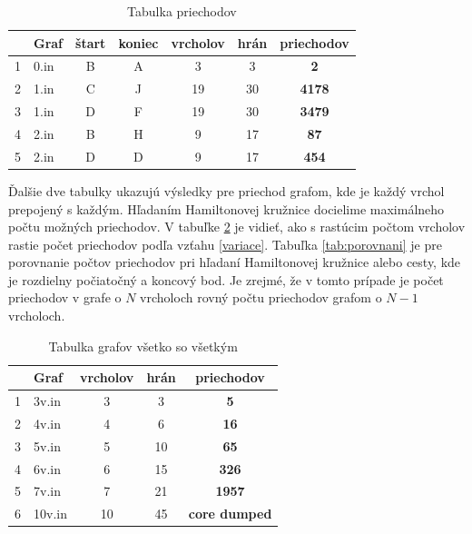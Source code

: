 \documentclass[a4paper,11pt, titlepage]{article}
\begin{document}
\begin{table}[h]
	\centering
	\begin{tabular}{|l|l|c|c|c|c|c|}
		\hline
		  & Graf & štart & koniec & vrcholov &  hrán & priechodov      \\ \hline
		1 & 0.in & B     & A     & 3             & 3          & \textbf{2}    \\ \hline
		2 & 1.in & C     & J     & 19            & 30         & \textbf{4178} \\ \hline
		3 & 1.in & D     & F     & 19            & 30         & \textbf{3479} \\ \hline
		4 & 2.in & B     & H     & 9             & 17         & \textbf{87}   \\ \hline
		5 & 2.in & D     & D     & 9             & 17         & \textbf{454}   \\ \hline
	\end{tabular}
	\caption{Tabulka priechodov}
	\label{tab:pruchody}
\end{table}

\vspace{1cm}

Ďalšie dve tabulky ukazujú výsledky pre priechod grafom, kde je každý vrchol prepojený s každým. Hľadaním Hamiltonovej kružnice docielime maximálneho počtu možných priechodov. V tabuľke \ref{tab:max} je vidieť, ako s rastúcim počtom vrcholov rastie počet priechodov podľa vzťahu \ref{variace}. Tabuľka \ref{tab:porovnani} je pre porovnanie počtov priechodov pri hľadaní Hamiltonovej kružnice alebo cesty, kde je rozdielny počiatočný a koncový bod. Je zrejmé, že v tomto prípade je počet priechodov v grafe o $N$ vrcholoch rovný počtu priechodov grafom o $N-1$ vrcholoch.

\vspace{1cm}

\begin{table}[h]
	\centering
	\begin{tabular}{|l|l|c|c|c|}
		\hline
		  & Graf  & vrcholov & hrán & priechodov \\ \hline
		1 & 3v.in & 3             & 3          & \textbf{5}           \\ \hline
		2 & 4v.in & 4             & 6          & \textbf{16}          \\ \hline
		3 & 5v.in & 5             & 10         & \textbf{65}          \\ \hline
		4 & 6v.in & 6             & 15         & \textbf{326}          \\ \hline
		5 & 7v.in & 7             & 21         & \textbf{1957}        \\ \hline
		6 & 10v.in & 10            & 45         & \textbf{core dumped} \\ \hline
	\end{tabular}
	\caption{Tabulka grafov všetko so všetkým}
	\label{tab:max}
\end{table}
\end{document}

